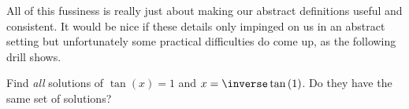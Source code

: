 All of this fussiness is really just about making our abstract
definitions useful  and
consistent. It would be nice if these details only impinged on us in an
abstract setting but unfortunately some  practical difficulties do
come up, as the following drill shows.


\begin{embeddedproblem}
  \vskip-2mm{}
  Find \emph{all} solutions of  $\tan(x)=1$ and
  $x=\inverse\tan\left(1\right)$. Do they have the same set of
  solutions?\\
\end{embeddedproblem}

